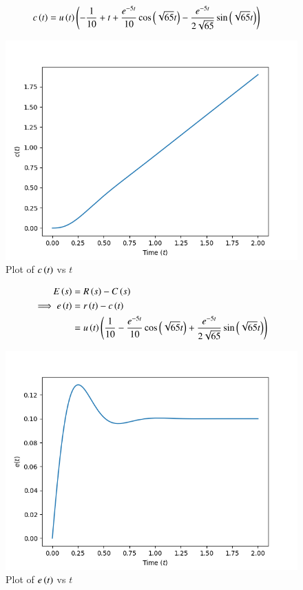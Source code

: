 \documentclass[journal,12pt,twocolumn]{IEEEtran}
\theoremstyle{remark}
\begin{document}
\begin{align}
c\left(t\right) &= u\left(t\right)\left(-\frac{1}{10} + t + \frac{e^{-5t}}{10} \cos{\ensuremath{\left(\sqrt{65}t\right)}} - \frac{e^{-5t}}{2\sqrt{65}}\sin{\ensuremath{\left(\sqrt{65}t\right)}}\right)
\end{align}
\begin{figure}[h!]
\centering
\includegraphics[width=\columnwidth]{figs/c_t.png}
\caption{Plot of $c\left(t\right)$ vs $t$}
\label{fig:2021bm46-3}
\end{figure}
\begin{align}
E\left(s\right) &= R\left(s\right) - C\left(s\right) \\
\implies e\left(t\right) &= r\left(t\right) - c\left(t\right) \\
&= u\left(t\right)\left(\frac{1}{10} - \frac{e^{-5t}}{10} \cos{\ensuremath{\left(\sqrt{65}t\right)}} + \frac{e^{-5t}}{2\sqrt{65}}\sin{\ensuremath{\left(\sqrt{65}t\right)}}\right)
\end{align}
\begin{figure}[h!]
\centering
\includegraphics[width=\columnwidth]{figs/e_t.png}
\caption{Plot of $e\left(t\right)$ vs $t$}
\label{fig:2021bm46-4}
\end{figure}
\end{document}

